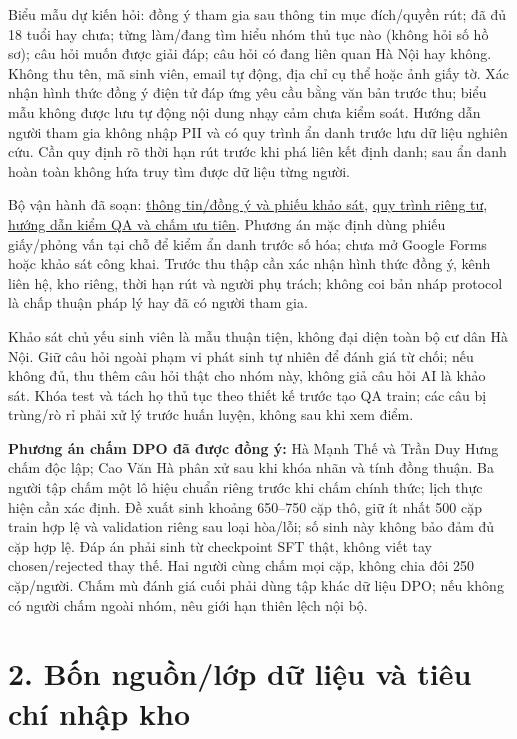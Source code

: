 \documentclass[11pt,a4paper]{article}
\begin{document}
Biểu mẫu dự kiến hỏi: đồng ý tham gia sau thông tin mục đích/quyền rút;
đã đủ 18 tuổi hay chưa; từng làm/đang tìm hiểu nhóm thủ tục nào (không
hỏi số hồ sơ); câu hỏi muốn được giải đáp; câu hỏi có đang liên quan Hà
Nội hay không. Không thu tên, mã sinh viên, email tự động, địa chỉ cụ
thể hoặc ảnh giấy tờ. Xác nhận hình thức đồng ý điện tử đáp ứng yêu cầu
bằng văn bản trước thu; biểu mẫu không được lưu tự động nội dung nhạy
cảm chưa kiểm soát. Hướng dẫn người tham gia không nhập PII và có quy
trình ẩn danh trước lưu dữ liệu nghiên cứu. Cần quy định rõ thời hạn rút
trước khi phá liên kết định danh; sau ẩn danh hoàn toàn không hứa truy
tìm được dữ liệu từng người.

Bộ vận hành đã soạn: \href{../data/consent-and-survey.md}{thông tin/đồng
ý và phiếu khảo sát}, \href{../data/privacy-workflow.md}{quy trình riêng
tư}, \href{../data/annotation-guide.md}{hướng dẫn kiểm QA và chấm ưu
tiên}. Phương án mặc định dùng phiếu giấy/phỏng vấn tại chỗ để kiểm ẩn
danh trước số hóa; chưa mở Google Forms hoặc khảo sát công khai. Trước
thu thập cần xác nhận hình thức đồng ý, kênh liên hệ, kho riêng, thời
hạn rút và người phụ trách; không coi bản nháp protocol là chấp thuận
pháp lý hay đã có người tham gia.

Khảo sát chủ yếu sinh viên là mẫu thuận tiện, không đại diện toàn bộ cư
dân Hà Nội. Giữ câu hỏi ngoài phạm vi phát sinh tự nhiên để đánh giá từ
chối; nếu không đủ, thu thêm câu hỏi thật cho nhóm này, không giả câu
hỏi AI là khảo sát. Khóa test và tách họ thủ tục theo thiết kế trước tạo
QA train; các câu bị trùng/rò rỉ phải xử lý trước huấn luyện, không sau
khi xem điểm.

\textbf{Phương án chấm DPO đã được đồng ý:} Hà Mạnh Thế và Trần Duy Hưng
chấm độc lập; Cao Văn Hà phân xử sau khi khóa nhãn và tính đồng thuận.
Ba người tập chấm một lô hiệu chuẩn riêng trước khi chấm chính thức;
lịch thực hiện cần xác định. Đề xuất sinh khoảng 650--750 cặp thô, giữ
ít nhất 500 cặp train hợp lệ và validation riêng sau loại hòa/lỗi; số
sinh này không bảo đảm đủ cặp hợp lệ. Đáp án phải sinh từ checkpoint SFT
thật, không viết tay chosen/rejected thay thế. Hai người cùng chấm mọi
cặp, không chia đôi 250 cặp/người. Chấm mù đánh giá cuối phải dùng tập
khác dữ liệu DPO; nếu không có người chấm ngoài nhóm, nêu giới hạn thiên
lệch nội bộ.

\section{2. Bốn nguồn/lớp dữ liệu và tiêu chí nhập
kho}\label{bux1ed1n-nguux1ed3nlux1edbp-dux1eef-liux1ec7u-vuxe0-tiuxeau-chuxed-nhux1eadp-kho}
\end{document}
